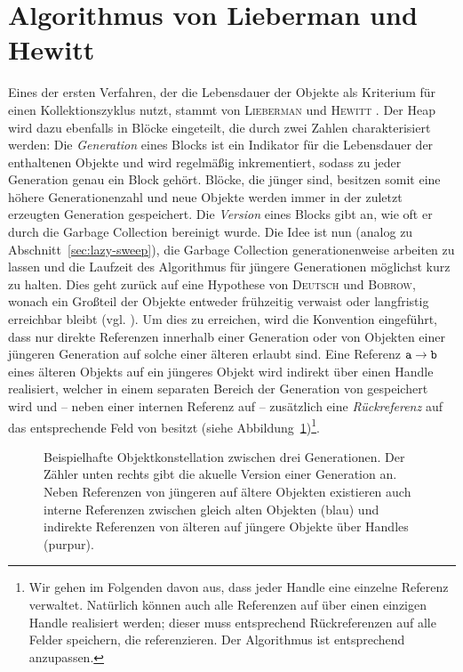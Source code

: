\section{Algorithmus von Lieberman und Hewitt}
\label{sec:lieberman}
Eines der ersten Verfahren, der die Lebensdauer der Objekte als Kriterium für einen Kollektionszyklus nutzt, stammt von \textsc{Lieberman} und \textsc{Hewitt} \cite{lieberman1983}.
Der Heap wird dazu ebenfalls in Blöcke eingeteilt, die durch zwei Zahlen charakterisiert werden:
Die \textit{Generation} eines Blocks ist ein Indikator für die Lebensdauer der enthaltenen Objekte und wird regelmäßig inkrementiert, sodass zu jeder Generation genau ein Block gehört.
Blöcke, die jünger sind, besitzen somit eine höhere Generationenzahl und neue Objekte werden immer in der zuletzt erzeugten Generation gespeichert.
Die \textit{Version} eines Blocks gibt an, wie oft er durch die Garbage Collection bereinigt wurde.
Die Idee ist nun (analog zu Abschnitt~\ref{sec:lazy-sweep}), die Garbage Collection generationenweise arbeiten zu lassen und die Laufzeit des Algorithmus für jüngere Generationen möglichst kurz zu halten.
Dies geht zurück auf eine Hypothese von \textsc{Deutsch} und \textsc{Bobrow}, wonach ein Großteil der Objekte entweder frühzeitig verwaist oder langfristig erreichbar bleibt (vgl. \cite[S. 523]{deutsch1976}).
Um dies zu erreichen, wird die Konvention eingeführt, dass nur direkte Referenzen innerhalb einer Generation oder von Objekten einer jüngeren Generation auf solche einer älteren erlaubt sind.
Eine Referenz $\texttt{a} \rightarrow \texttt{b}$ eines älteren Objekts  auf ein jüngeres Objekt  wird indirekt über einen Handle realisiert, welcher in einem separaten Bereich der Generation von  gespeichert wird und -- neben einer internen Referenz auf  -- zusätzlich eine \textit{Rückreferenz}  auf das entsprechende Feld von  besitzt (siehe Abbildung~\ref{fig:lieberman-generations})\footnote{Wir gehen im Folgenden davon aus, dass jeder Handle eine einzelne Referenz verwaltet. Natürlich können auch alle Referenzen auf  über einen einzigen Handle realisiert werden; dieser muss entsprechend Rückreferenzen auf alle Felder speichern, die  referenzieren. Der Algorithmus ist entsprechend anzupassen.}.

\begin{figure}[h]
	\centering
	
	\caption[Beispielhafte Objektkonstellation zwischen drei Generationen]{Beispielhafte Objektkonstellation zwischen drei Generationen. Der Zähler unten rechts gibt die akuelle Version einer Generation an. Neben Referenzen von jüngeren auf ältere Objekten existieren auch interne Referenzen zwischen gleich alten Objekten (\textcolor{ctcolormain}{blau}) und indirekte Referenzen von älteren auf jüngere Objekte über Handles (\textcolor{ctcoloraccessory}{purpur}).}
	\label{fig:lieberman-generations}
\end{figure}

